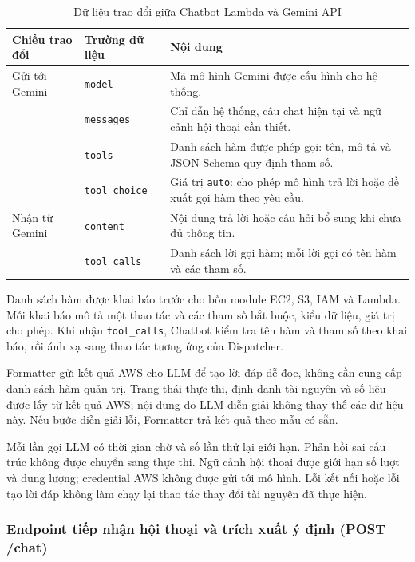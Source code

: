 \documentclass[a4paper,12pt]{article}
\begin{document}
\begin{table}[H]
\centering
\caption{Dữ liệu trao đổi giữa Chatbot Lambda và Gemini API}
\label{tab:llm_exchange}
\fontsize{11}{14}\selectfont
\begin{tabularx}{\linewidth}{@{}>{\raggedright\arraybackslash}p{2.4cm}>{\raggedright\arraybackslash}p{3.2cm}Y@{}}
\toprule
\textbf{Chiều trao đổi} & \textbf{Trường dữ liệu} & \textbf{Nội dung}\\
\midrule
Gửi tới Gemini & \texttt{model} & Mã mô hình Gemini được cấu hình cho hệ thống.\\
 & \texttt{messages} & Chỉ dẫn hệ thống, câu chat hiện tại và ngữ cảnh hội thoại cần thiết.\\
 & \texttt{tools} & Danh sách hàm được phép gọi: tên, mô tả và JSON Schema quy định tham số.\\
 & \texttt{tool\_choice} & Giá trị \texttt{auto}: cho phép mô hình trả lời hoặc đề xuất gọi hàm theo yêu cầu.\\
\midrule
Nhận từ Gemini & \texttt{content} & Nội dung trả lời hoặc câu hỏi bổ sung khi chưa đủ thông tin.\\
 & \texttt{tool\_calls} & Danh sách lời gọi hàm; mỗi lời gọi có tên hàm và các tham số.\\
\bottomrule
\end{tabularx}
\end{table}

Danh sách hàm được khai báo trước cho bốn module EC2, S3, IAM và Lambda. Mỗi khai báo mô tả một thao tác và các tham số bắt buộc, kiểu dữ liệu, giá trị cho phép. Khi nhận \texttt{tool\_calls}, Chatbot kiểm tra tên hàm và tham số theo khai báo, rồi ánh xạ sang thao tác tương ứng của Dispatcher.

Formatter gửi kết quả AWS cho LLM để tạo lời đáp dễ đọc, không cần cung cấp danh sách hàm quản trị. Trạng thái thực thi, định danh tài nguyên và số liệu được lấy từ kết quả AWS; nội dung do LLM diễn giải không thay thế các dữ liệu này. Nếu bước diễn giải lỗi, Formatter trả kết quả theo mẫu có sẵn.

Mỗi lần gọi LLM có thời gian chờ và số lần thử lại giới hạn. Phản hồi sai cấu trúc không được chuyển sang thực thi. Ngữ cảnh hội thoại được giới hạn số lượt và dung lượng; credential AWS không được gửi tới mô hình. Lỗi kết nối hoặc lỗi tạo lời đáp không làm chạy lại thao tác thay đổi tài nguyên đã thực hiện.


\subsubsection{Endpoint tiếp nhận hội thoại và trích xuất ý định (POST /chat)}
\end{document}
